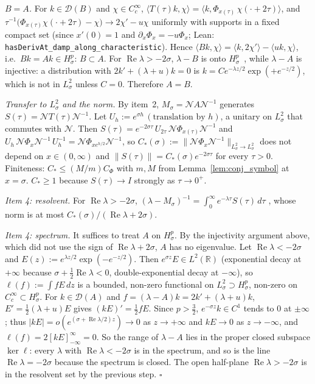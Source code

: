 \documentclass[11pt,a4paper]{article}
\begin{document}
\emph{$B=A$.}  For $k\in\mathcal{D}(B)$ and $\chi\in C_c^\infty$,
$\langle T(\tau)k,\chi\rangle=\langle k,\Phi_{x(\tau)}\,\chi(\cdot+2\tau)\rangle$, and
$\tau^{-1}\bigl(\Phi_{x(\tau)}\chi(\cdot+2\tau)-\chi\bigr)\to2\chi'-u\chi$ uniformly with supports in a fixed compact set
(since $x'(0)=1$ and $\partial_x\Phi_x=-u\Phi_x$; Lean: \texttt{hasDerivAt\_damp\_along\_characteristic}).  Hence
$\langle Bk,\chi\rangle=\langle k,2\chi'\rangle-\langle uk,\chi\rangle$, i.e.\ $Bk=Ak\in H^p_\sigma$: $B\subset A$.
For $\operatorname{Re}\lambda>-2\sigma$, $\lambda-B$ is onto $H^p_\sigma$~\cite[Thm.~II.1.10]{engelnagel2000}, while $\lambda-A$ is injective:
a distribution with $2k'+(\lambda+u)k=0$ is $k=Ce^{-\lambda z/2}\exp(+e^{-z/2})$, which is not in $L^2_\sigma$ unless $C=0$.
Therefore $A=B$.

\emph{Transfer to $L^2_\sigma$ and the norm.}  By item~2, $M_\sigma=\mathcal{N}A\mathcal{N}^{-1}$ generates
$S(\tau)=\mathcal{N}T(\tau)\mathcal{N}^{-1}$.  Let $U_h:=e^{\sigma h}\,(\text{translation by }h)$, a unitary on $L^2_\sigma$ that commutes with
$\mathcal{N}$.  Then $S(\tau)=e^{-2\sigma\tau}\,U_{2\tau}\,\mathcal{N}\Phi_{x(\tau)}\mathcal{N}^{-1}$ and
$U_h\,\mathcal{N}\Phi_x\mathcal{N}^{-1}\,U_h^{-1}=\mathcal{N}\Phi_{xe^{h/2}}\mathcal{N}^{-1}$, so
$C_*(\sigma):=\|\mathcal{N}\Phi_x\mathcal{N}^{-1}\|_{L^2_\sigma\to L^2_\sigma}$ does not depend on $x\in(0,\infty)$ and
$\|S(\tau)\|=C_*(\sigma)e^{-2\sigma\tau}$ for every $\tau>0$.  Finiteness: $C_*\le(M/m)C_\Phi$ with $m,M$ from
Lemma~\ref{lem:conj_symbol} at $x=\sigma$.  $C_*\ge1$ because $S(\tau)\to I$ strongly as $\tau\to0^+$.

\emph{Item 4: resolvent.}  For $\operatorname{Re}\lambda>-2\sigma$, $(\lambda-M_\sigma)^{-1}=\int_0^\infty e^{-\lambda\tau}S(\tau)\,d\tau$
\cite[Thm.~II.1.10]{engelnagel2000}, whose norm is at most $C_*(\sigma)/(\operatorname{Re}\lambda+2\sigma)$.

\emph{Item 4: spectrum.}  It suffices to treat $A$ on $H^p_\sigma$.  By the injectivity argument above, which did not use the sign of
$\operatorname{Re}\lambda+2\sigma$, $A$ has no eigenvalue.  Let $\operatorname{Re}\lambda<-2\sigma$ and
$E(z):=e^{\lambda z/2}\exp(-e^{-z/2})$.  Then $e^{\sigma z}E\in L^2(\mathbb{R})$ (exponential decay at $+\infty$ because
$\sigma+\tfrac12\operatorname{Re}\lambda<0$, double-exponential decay at $-\infty$), so $\ell(f):=\int fE\,dz$ is a bounded, non-zero
functional on $L^2_\sigma\supset H^p_\sigma$, non-zero on $C_c^\infty\subset H^p_\sigma$.  For $k\in\mathcal{D}(A)$ and $f=(\lambda-A)k=2k'+(\lambda+u)k$,
$E'=\tfrac12(\lambda+u)E$ gives $(kE)'=\tfrac12fE$.  Since $p>\tfrac32$, $e^{-\sigma z}k\in C^1$ tends to $0$ at $\pm\infty$; thus
$|kE|=o(e^{(\sigma+\operatorname{Re}\lambda/2)z})\to0$ as $z\to+\infty$ and $kE\to0$ as $z\to-\infty$, and $\ell(f)=2[kE]_{-\infty}^{\infty}=0$.
So the range of $\lambda-A$ lies in the proper closed subspace $\ker\ell$: every $\lambda$ with $\operatorname{Re}\lambda<-2\sigma$ is in the
spectrum, and so is the line $\operatorname{Re}\lambda=-2\sigma$ because the spectrum is closed.  The open half-plane
$\operatorname{Re}\lambda>-2\sigma$ is in the resolvent set by the previous step. \hfill$\square$
\end{document}

